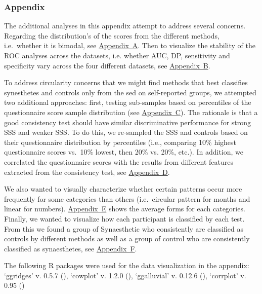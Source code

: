 \documentclass[
  man,
  longtable,
  a4paper,
  nolmodern,
  notxfonts,
  notimes,
  colorlinks=true,linkcolor=blue,citecolor=blue,urlcolor=blue]{apa7}
\begin{document}
\newpage{}

\subsubsection{Appendix}\label{appendix}

The additional analyses in this appendix attempt to address several
concerns. Regarding the distribution's of the scores from the different
methods, i.e.~whether it is bimodal, see
\hyperref[apx-featDensity]{Appendix~A}. Then to visualize the stability
of the ROC analyses across the datasets, i.e. whether AUC, DP,
sensitivity and specificity vary across the four different datasets, see
\hyperref[apx-SM2byds]{Appendix~B}.

To address circularity concerns that we might find methods that best
classifies synesthetes and controls only from the sed on self-reported
groups, we attempted two additional approaches: first, testing
sub-samples based on percentiles of the questionnaire score sample
distribution (see \hyperref[apx-byquestperc]{Appendix~C}). The rationale
is that a good consistency test should have similar discriminative
performance for strong SSS and weaker SSS. To do this, we re-sampled the
SSS and controls based on their questionnaire distribution by
percentiles (i.e., comparing 10\% highest questionnaire scores vs.~10\%
lowest, then 20\% vs. 20\%, etc.). In addition, we correlated the
questionnaire scores with the results from different features extracted
from the consistency test, see
\hyperref[apx-correlation-with-self-report]{Appendix~D}.

We also wanted to visually characterize whether certain patterns occur
more frequently for some categories than others (i.e.~circular pattern
for months and linear for numbers).
\hyperref[apx-average-forms]{Appendix~E} shows the average forms for
each categories. Finally, we wanted to visualize how each participant is
classified by each test. From this we found a group of Synaesthetic who
consistently are classified as controls by different methods as well as
a group of control who are consistently classified as synaesthetes, see
\hyperref[apx-alluvial]{Appendix~F}.

The following R packages were used for the data visualization in the
appendix: `ggridges' v. 0.5.7 (),
`cowplot' v. 1.2.0 (), `ggalluvial'
v. 0.12.6 (), `corrplot'
v. 0.95 ()
\end{document}
